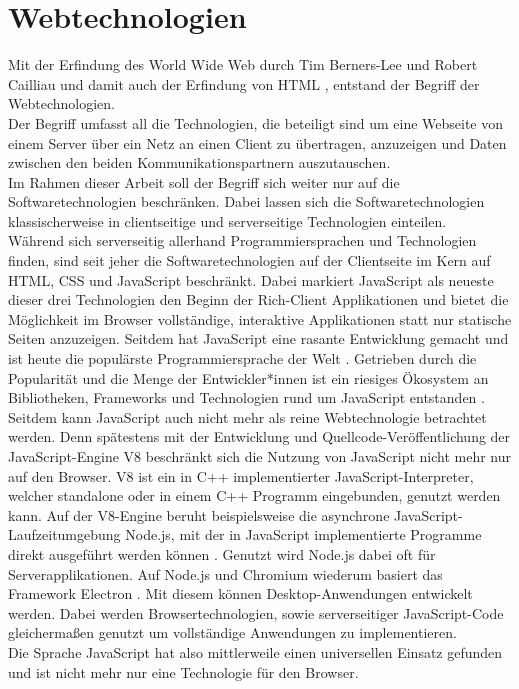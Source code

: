 \section{Webtechnologien}
\label{sec:webtechnologien}

Mit der Erfindung des World Wide Web durch Tim Berners-Lee und Robert Cailliau und damit auch der Erfindung 
von HTML \cite{www}, entstand der Begriff der Webtechnologien.\\
Der Begriff umfasst all die Technologien, die beteiligt sind um eine Webseite von einem Server über ein Netz 
an einen Client zu übertragen, anzuzeigen und Daten zwischen den beiden Kommunikationspartnern auszutauschen.\\

Im Rahmen dieser Arbeit soll der Begriff sich weiter nur auf die Softwaretechnologien beschränken. Dabei lassen
sich die Softwaretechnologien klassischerweise in clientseitige und serverseitige Technologien einteilen.\\
Während sich serverseitig allerhand Programmiersprachen und Technologien finden, sind seit jeher die Softwaretechnologien
auf der Clientseite im Kern auf HTML, CSS und JavaScript beschränkt. Dabei markiert JavaScript als neueste dieser
drei Technologien \cite{jspress} den Beginn der Rich-Client Applikationen und bietet die Möglichkeit im Browser 
vollständige, interaktive Applikationen statt nur statische Seiten anzuzeigen. Seitdem hat JavaScript eine rasante 
Entwicklung gemacht und ist heute die populärste Programmiersprache der Welt \cite{npmstat}. Getrieben durch 
die Popularität und die Menge der Entwickler*innen ist ein riesiges Ökosystem an Bibliotheken, Frameworks
und Technologien rund um JavaScript entstanden \cite{npmstat}. Seitdem kann JavaScript auch nicht mehr als reine Webtechnologie
betrachtet werden.
Denn spätestens mit der Entwicklung und Quellcode-Veröffentlichung der JavaScript-Engine V8 \cite{v8} beschränkt 
sich die Nutzung von JavaScript nicht mehr nur auf den Browser. V8 ist ein in C++ implementierter JavaScript-Interpreter, 
welcher standalone oder in einem C++ Programm eingebunden, genutzt werden kann. Auf der V8-Engine beruht beispielsweise 
die asynchrone JavaScript-Laufzeitumgebung Node.js, mit der in JavaScript implementierte Programme direkt ausgeführt 
werden können \cite{node}. Genutzt wird Node.js dabei oft für Serverapplikationen.
Auf Node.js und Chromium wiederum basiert das Framework Electron \cite{electron}. Mit diesem können Desktop-Anwendungen
entwickelt werden. Dabei werden Browsertechnologien, sowie serverseitiger JavaScript-Code gleichermaßen
genutzt um vollständige Anwendungen zu implementieren.\\
Die Sprache JavaScript hat also mittlerweile einen universellen Einsatz gefunden 
und ist nicht mehr nur eine Technologie für den Browser.\\

